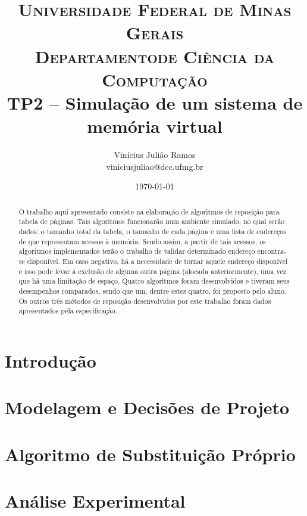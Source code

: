 \documentclass[10pt]{extarticle}
\title{ \textsc{Universidade Federal de Minas Gerais} \\
\textsc{Departamentode Ciência da Computação} \\
\bigskip TP2 -- Simulação de um sistema de memória virtual}
\author{Vinícius Julião Ramos \\ \normalsize{viniciusjuliao@dcc.ufmg.br}}
\date{\today}
\begin{document}
\maketitle

\begin{abstract}
O trabalho aqui apresentado consiste na elaboração de algoritmos de
reposição para tabela de páginas.
Tais algoritmos funcionarão num ambiente simulado, no qual serão dados: o
tamanho total da tabela, o tamanho de cada página e  uma lista de endereços de
que representam acessos à memória.
Sendo assim, a partir de tais acessos, os algoritmos implementados terão o
trabalho de validar determinado endereço encontra-se disponível.
Em caso negativo, há a necessidade de tornar aquele endereço disponível e
isso pode levar à exclusão de alguma outra página (alocada anteriormente),
uma vez que há uma limitação de espaço.
Quatro algoritmos foram desenvolvidos e tiveram seus desempenhos comparados,
sendo que um, dentre estes quatro, foi proposto pelo aluno.
Os outros três métodos de reposição desenvolvidos por este trabalho foram dados
apresentados pela especificação.
\end{abstract}
    
\section{Introdução}

\newpage

\section{Modelagem e Decisões de Projeto}


\section{Algoritmo de Substituição Próprio}


\section{Análise Experimental}


% 

\end{document}
